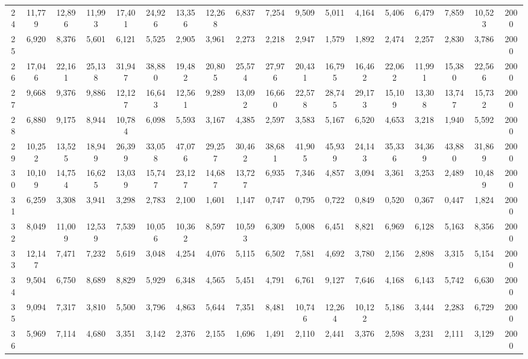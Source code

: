 {\begin{longtable}{ >{\tiny}cccccccccccccccccc}
24  & 11,779 & 12,896 & 11,993 & 17,401 & 24,926 & 13,356 & 12,268 & 6,837  & 7,254  & 9,509  & 5,011  & 4,164  & 5,406   & 6,479   & 7,859   & 10,523 & 2000 \\
25  & 6,920  & 8,376  & 5,601  & 6,121  & 5,525  & 2,905  & 3,961  & 2,273  & 2,218  & 2,947  & 1,579  & 1,892  & 2,474   & 2,257   & 2,830   & 3,786  & 2000 \\
26  & 17,046 & 22,161 & 25,138 & 31,947 & 38,880 & 19,482 & 20,805 & 25,574 & 27,976 & 20,431 & 16,795 & 16,462 & 22,062  & 11,991  & 15,380  & 22,566 & 2000 \\
27  & 9,668  & 9,376  & 9,886  & 12,127 & 16,643 & 12,561 & 9,289  & 13,092 & 16,660 & 22,578 & 28,745 & 29,173 & 15,109  & 13,308  & 13,747  & 15,732 & 2000 \\
28  & 6,880  & 9,175  & 8,944  & 10,784 & 6,098  & 5,593  & 3,167  & 4,385  & 2,597  & 3,583  & 5,167  & 6,520  & 4,653   & 3,218   & 1,940   & 5,592  & 2000 \\
29  & 10,252 & 13,525 & 18,949 & 26,399 & 33,058 & 47,076 & 29,257 & 30,462 & 38,681 & 41,905 & 45,939 & 24,143 & 35,336  & 34,369  & 43,880  & 31,869 & 2000 \\
30  & 10,109 & 14,754 & 16,625 & 13,039 & 15,747 & 23,127 & 14,687 & 13,727 & 6,935  & 7,346  & 4,857  & 3,094  & 3,361   & 3,253   & 2,489   & 10,489 & 2000 \\
31  & 6,259  & 3,308  & 3,941  & 3,298  & 2,783  & 2,100  & 1,601  & 1,147  & 0,747  & 0,795  & 0,722  & 0,849  & 0,520   & 0,367   & 0,447   & 1,824  & 2000 \\
32  & 8,049  & 11,009 & 12,539 & 7,539  & 10,056 & 10,362 & 8,597  & 10,593 & 6,309  & 5,008  & 6,451  & 8,821  & 6,969   & 6,128   & 5,163   & 8,356  & 2000 \\
33  & 12,147 & 7,471  & 7,232  & 5,619  & 3,048  & 4,254  & 4,076  & 5,115  & 6,502  & 7,581  & 4,692  & 3,780  & 2,156   & 2,898   & 3,315   & 5,154  & 2000 \\
34  & 9,504  & 6,750  & 8,689  & 8,829  & 5,929  & 6,348  & 4,565  & 5,451  & 4,791  & 6,761  & 9,127  & 7,646  & 4,168   & 6,143   & 5,742   & 6,630  & 2000 \\
35  & 9,094  & 7,317  & 3,810  & 5,500  & 3,796  & 4,863  & 5,644  & 7,351  & 8,481  & 10,746 & 12,264 & 10,122 & 5,186   & 3,444   & 2,283   & 6,729  & 2000 \\
36  & 5,969  & 7,114  & 4,680  & 3,351  & 3,142  & 2,376  & 2,155  & 1,696  & 1,491  & 2,110  & 2,441  & 3,376  & 2,598   & 3,231   & 2,111   & 3,129  & 2000 \\

\end{longtable}}
